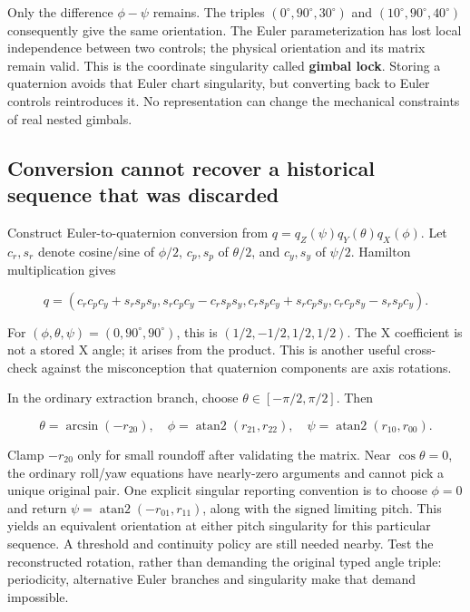 Only the difference \(\phi-\psi\) remains. The triples \((0^\circ,90^\circ,30^\circ)\) and \((10^\circ,90^\circ,40^\circ)\) consequently give the same orientation. The Euler parameterization has lost local independence between two controls; the physical orientation and its matrix remain valid. This is the coordinate singularity called \textbf{gimbal lock}. Storing a quaternion avoids that Euler chart singularity, but converting back to Euler controls reintroduces it. No representation can change the mechanical constraints of real nested gimbals.

\subsection{Conversion cannot recover a historical sequence that was discarded}\label{01-foundations-i-ch019-conversion-cannot-recover-a-historical-sequence-that-was-discarded}

\hypertarget{01-foundations-i-ch019-conversion-cannot-recover-a-historical-sequence-that-was-discarded}{}

Construct Euler-to-quaternion conversion from \(q=q_Z(\psi)q_Y(\theta)q_X(\phi)\). Let \(c_r,s_r\) denote cosine/sine of \(\phi/2\), \(c_p,s_p\) of \(\theta/2\), and \(c_y,s_y\) of \(\psi/2\). Hamilton multiplication gives

\[
q=(c_rc_pc_y+s_rs_ps_y,
s_rc_pc_y-c_rs_ps_y,
c_rs_pc_y+s_rc_ps_y,
c_rc_ps_y-s_rs_pc_y).
\]

For \((\phi,\theta,\psi)=(0,90^\circ,90^\circ)\), this is \((1/2,-1/2,1/2,1/2)\). The X coefficient is not a stored X angle; it arises from the product. This is another useful cross-check against the misconception that quaternion components are axis rotations.

In the ordinary extraction branch, choose \(\theta\in[-\pi/2,\pi/2]\). Then

\[
\theta=\arcsin(-r_{20}),\quad
\phi=\operatorname{atan2}(r_{21},r_{22}),\quad
\psi=\operatorname{atan2}(r_{10},r_{00}).
\]

Clamp \(-r_{20}\) only for small roundoff after validating the matrix. Near \(\cos\theta=0\), the ordinary roll/yaw equations have nearly-zero arguments and cannot pick a unique original pair. One explicit singular reporting convention is to choose \(\phi=0\) and return \(\psi=\operatorname{atan2}(-r_{01},r_{11})\), along with the signed limiting pitch. This yields an equivalent orientation at either pitch singularity for this particular sequence. A threshold and continuity policy are still needed nearby. Test the reconstructed rotation, rather than demanding the original typed angle triple: periodicity, alternative Euler branches and singularity make that demand impossible.

